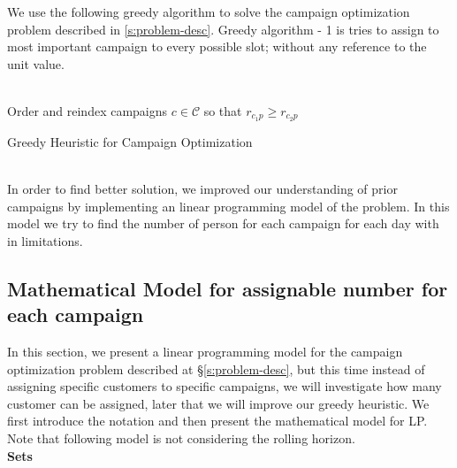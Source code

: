 \documentclass[11pt]{article}
\begin{document}
We use the following greedy algorithm to solve the campaign optimization problem described in \ref{s:problem-desc}. Greedy algorithm - 1 is tries to assign to most important campaign to every possible slot; without any reference to the unit value.

\begin{algorithm}[H]
\\
Order and reindex campaigns $c\in\mathcal{C}$ so that $r_{c_{1}p} \geq r_{c_{2}p}$
\\
\;
\caption{Greedy Heuristic for Campaign Optimization}
\label{algo:greedy_impl1}
\end{algorithm}\\

In order to find better solution, we improved our understanding of prior campaigns by implementing an linear programming model of the problem. In this model we try to find the number of person for each campaign for each day with in limitations.

\subsection{Mathematical Model for assignable number for each campaign} \label{s:problem-math-lp}

In this section, we present a linear programming model for the campaign optimization problem described at \S \ref{s:problem-desc}, but this time instead of assigning specific customers to specific campaigns, we will investigate how many customer can be assigned, later that we will improve our greedy heuristic. We first introduce the notation and then present the mathematical model for LP. Note that following model is not considering the rolling horizon.\\
\noindent \textbf{Sets}\\
\end{document}
